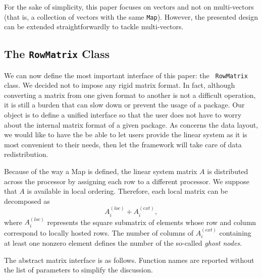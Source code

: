 \documentclass[acmtocl]{acmtrans2m}
\begin{document}
For the sake of simplicity, this paper focuses on vectors and not on
multi-vectors (that is, a collection of vectors with the same {\tt Map}).
However, the presented design can be extended straightforwardly to tackle
multi-vectors.

\subsection{The {\tt RowMatrix} Class}

We can now define the most important interface of this paper: the {\tt
  RowMatrix} class. We decided not to impose any rigid matrix format.
In fact, although converting a matrix from
one given format to another is not a difficult operation, it is still a burden
that can slow down or prevent the usage of a package. Our object is to define
a unified interface so that the user does not have to worry about the internal
matrix format of a given package. As concerns the
data layout, we would like to have the be able to let users provide the linear
system as it is most convenient to their needs, then let the framework will
take care of data redistribution.  

Because of the way a Map is defined, the linear system matrix $A$ is
distributed
across the processor by assigning each row to a different processor.
We suppose that $A$ is available in local ordering.
Therefore, each local matrix can be decomposed as
\begin{equation}
A^{(loc)}_i + A^{(ext)}_i,
  \end{equation}
where $A^{(loc)}_i$ represents the square submatrix of elements whose row
and column correspond to locally hosted rows. The number of columns of
$A^{(ext)}_i$ containing at least one nonzero element defines the number of
the so-called {\sl ghost nodes}.

\smallskip

The abstract matrix interface is as
follows. Function names are reported
without the list of parameters to simplify the discussion.
\end{document}
